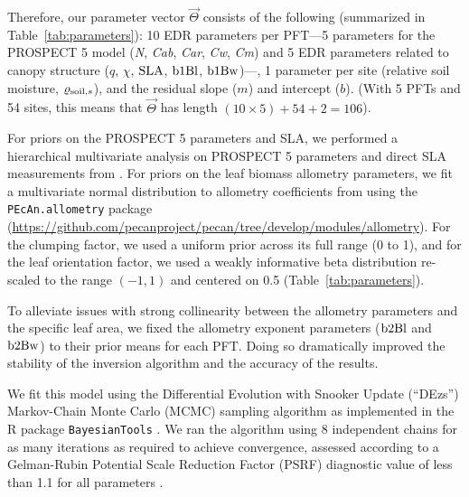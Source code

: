 Therefore, our parameter vector $\vec{\Theta}$ consists of the following (summarized in Table~\ref{tab:parameters}):
10 EDR parameters per PFT---5 parameters for the PROSPECT 5 model (\emph{N}, \emph{Cab}, \emph{Car}, \emph{Cw}, \emph{Cm}) and 5 EDR parameters related to canopy structure ($q$, $\chi$, $\mathrm{SLA}$, $\mathrm{b1Bl}$, $\mathrm{b1Bw}$)---,
1 parameter per site (relative soil moisture, $\varrho_{\mathrm{soil}, s}$),
and the residual slope ($m$) and intercept ($b$).
(With 5 PFTs and 54 sites, this means that $\vec{\Theta}$ has length $(10 \times 5) + 54 + 2 = 106$).

For priors on the PROSPECT 5 parameters and SLA, we performed a hierarchical multivariate analysis \citep{shiklomanov2020does} on PROSPECT 5 parameters and direct SLA measurements from \citep[][Chapter 3]{shiklomanov_dissertation}.
For priors on the leaf biomass allometry parameters, we fit a multivariate normal distribution to allometry coefficients from \citet{jenkins2003nationalscale,jenkins2004comprehensive} using the \texttt{PEcAn.allometry} package (\url{https://github.com/pecanproject/pecan/tree/develop/modules/allometry}).
For the clumping factor, we used a uniform prior across its full range (0 to 1), and for the leaf orientation factor, we used a weakly informative beta distribution re-scaled to the range $(-1, 1)$ and centered on 0.5 (Table~\ref{tab:parameters}).

To alleviate issues with strong collinearity between the allometry parameters and the specific leaf area, we fixed the allometry exponent parameters ($\mathrm{b2Bl}$ and $\mathrm{b2Bw}$) to their prior means for each PFT.
Doing so dramatically improved the stability of the inversion algorithm and the accuracy of the results.

We fit this model using the Differential Evolution with Snooker Update (``DEzs'') Markov-Chain Monte Carlo (MCMC) sampling algorithm \citep{terbraak2008differential} as implemented in the R package \texttt{BayesianTools} \citep{bayesiantools}.
We ran the algorithm using 8 independent chains for as many iterations as required to achieve convergence, assessed according to a Gelman-Rubin Potential Scale Reduction Factor (PSRF) diagnostic value of less than 1.1 for all parameters \citep{gelman1992inference}.

